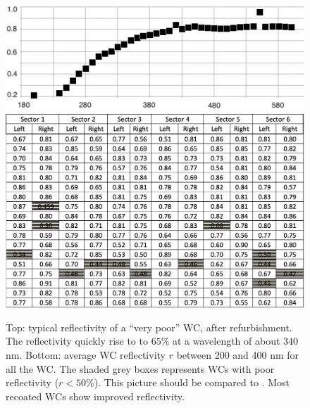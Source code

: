 \begin{figure}
	\centering
	\includegraphics[width=0.98\columnwidth,keepaspectratio]{img/winstoConeSample1Reflectivity.png}
	\includegraphics[width=0.98\columnwidth,keepaspectratio]{img/wcStatusAfter.png}
	\caption{Top: typical reflectivity of a ``very poor'' WC, after refurbishment.
            The reflectivity quickly rise to to $65\%$ at a wavelength of about 340 nm. Bottom: average WC reflectivity $r$ between 200 and 400 nm for
			all the WC. The shaded grey boxes represents WCs with poor reflectivity ($r < 50\%$).
            This picture should be compared to . Most recoated WCs show improved reflectivity.}
	\label{fig:wcStatusAfter}
\end{figure}


